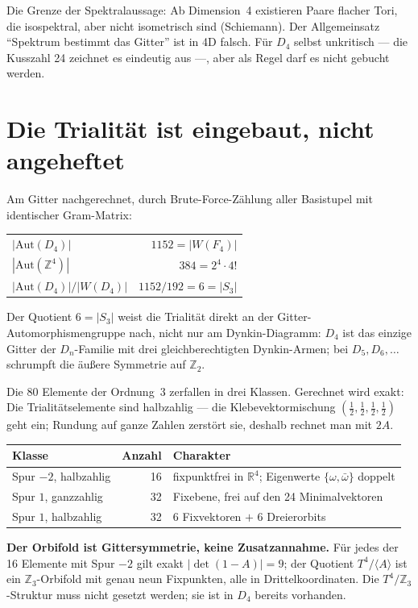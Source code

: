 Die Grenze der Spektralaussage: Ab Dimension~4 existieren Paare flacher
Tori, die isospektral, aber nicht isometrisch sind (Schiemann). Der
Allgemeinsatz \enquote{Spektrum bestimmt das Gitter} ist in 4D falsch.
Für $D_4$ selbst unkritisch --- die Kusszahl 24 zeichnet es eindeutig
aus ---, aber als Regel darf es nicht gebucht werden.

\section{Die Trialität ist eingebaut, nicht angeheftet}

Am Gitter nachgerechnet, durch Brute-Force-Zählung aller Basistupel mit
identischer Gram-Matrix:
\begin{center}
\small
\begin{tabular}{lr}
\toprule
$|\mathrm{Aut}(D_4)|$ & $1152 = |W(F_4)|$ \\
$|\mathrm{Aut}(\mathbb{Z}^4)|$ & $384 = 2^4\cdot4!$ \\
$|\mathrm{Aut}(D_4)|/|W(D_4)|$ & $1152/192 = 6 = |S_3|$ \\
\bottomrule
\end{tabular}
\end{center}
Der Quotient $6 = |S_3|$ weist die Trialität direkt an der
Gitter-Automorphismengruppe nach, nicht nur am Dynkin-Diagramm: $D_4$ ist
das einzige Gitter der $D_n$-Familie mit drei gleichberechtigten
Dynkin-Armen; bei $D_5,D_6,\dots$ schrumpft die äußere Symmetrie auf
$\mathbb{Z}_2$.

Die 80 Elemente der Ordnung~3 zerfallen in drei Klassen. Gerechnet wird
exakt: Die Trialitätselemente sind halbzahlig --- die Klebevektormischung
$(\frac12,\frac12,\frac12,\frac12)$ geht ein; Rundung auf ganze Zahlen
zerstört sie, deshalb rechnet man mit $2A$.
\begin{center}
\small
\begin{tabular}{lrp{4.5cm}}
\toprule
Klasse & Anzahl & Charakter \\
\midrule
Spur $-2$, halbzahlig & 16 & fixpunktfrei in $\mathbb{R}^4$; Eigenwerte $\{\omega,\bar\omega\}$ doppelt \\
Spur $1$, ganzzahlig & 32 & Fixebene, frei auf den 24 Minimalvektoren \\
Spur $1$, halbzahlig & 32 & 6 Fixvektoren $+$ 6 Dreierorbits \\
\bottomrule
\end{tabular}
\end{center}

\textbf{Der Orbifold ist Gittersymmetrie, keine Zusatzannahme.} Für
jedes der 16 Elemente mit Spur $-2$ gilt exakt $|\det(1-A)| = 9$; der
Quotient $T^4/\langle A\rangle$ ist ein $\mathbb{Z}_3$-Orbifold mit genau
neun Fixpunkten, alle in Drittelkoordinaten. Die $T^4/\mathbb{Z}_3$-Struktur
muss nicht gesetzt werden; sie ist in $D_4$ bereits vorhanden.

